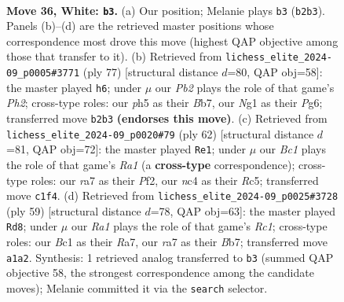 \documentclass[11pt]{article}
\begin{document}
\clearpage

\begin{figure}[p]\centering
\begin{subfigure}{0.46\textwidth}\centering
\resizebox{\linewidth}{!}{%
\newchessgame
\chessboard[
  setfen={3r4/r7/p1B1bk2/p4ppp/2n5/P4PP1/1P5P/RKB2RN1 w - - 2 36},
  showmover=false,
  pgfstyle=straightmove, color=movearrow, markmove={b2-b3}
]}
\caption{}
\end{subfigure}\hfill
\begin{subfigure}{0.46\textwidth}\centering
\resizebox{\linewidth}{!}{%
\newchessgame
\chessboard[
  setfen={8/pbp1r1kp/1p4p1/1P4N1/3rp3/6BP/R4PPK/8 b - - 1 39},
  showmover=false,
  pgfstyle=straightmove, color=movearrow, markmove={h7-h6}
]}
\caption{}
\end{subfigure}
\\[4pt]
\begin{subfigure}{0.46\textwidth}\centering
\resizebox{\linewidth}{!}{%
\newchessgame
\chessboard[
  setfen={3r4/2p1rpk1/p4n1p/2R2BpP/6P1/1P6/2P2P2/R4K2 w - - 3 32},
  showmover=false,
  pgfstyle=straightmove, color=movearrow, markmove={a1-e1}
]}
\caption{}
\end{subfigure}\hfill
\begin{subfigure}{0.46\textwidth}\centering
\resizebox{\linewidth}{!}{%
\newchessgame
\chessboard[
  setfen={2r3k1/rb1n2pp/2pPR3/1p6/p7/P1N2P2/1P4PP/3R1BK1 b - - 0 30},
  showmover=false,
  pgfstyle=straightmove, color=movearrow, markmove={c8-d8}
]}
\caption{}
\end{subfigure}
\caption{\textbf{Move 36, White: \texttt{b3}.} (a) Our position; Melanie plays \texttt{b3} (\texttt{b2b3}). Panels (b)--(d) are the retrieved master positions whose correspondence most drove this move (highest QAP objective among those that transfer to it). (b) Retrieved from \texttt{lichess\_elite\_2024-09\_p0005\#3771} (ply 77) [structural distance $d$=80, QAP obj=58]: the master played \texttt{h6}; under $\mu$ our \emph{Pb2} plays the role of that game's \emph{Ph2}; cross-type roles: our \emph{p}h5 as their \emph{B}b7, our \emph{N}g1 as their \emph{P}g6; transferred move \texttt{b2b3} \textbf{(endorses this move)}. (c) Retrieved from \texttt{lichess\_elite\_2024-09\_p0020\#79} (ply 62) [structural distance $d$=81, QAP obj=72]: the master played \texttt{Re1}; under $\mu$ our \emph{Bc1} plays the role of that game's \emph{Ra1} (a \textbf{cross-type} correspondence); cross-type roles: our \emph{r}a7 as their \emph{P}f2, our \emph{n}c4 as their \emph{R}c5; transferred move \texttt{c1f4}. (d) Retrieved from \texttt{lichess\_elite\_2024-09\_p0025\#3728} (ply 59) [structural distance $d$=78, QAP obj=63]: the master played \texttt{Rd8}; under $\mu$ our \emph{Ra1} plays the role of that game's \emph{Rc1}; cross-type roles: our \emph{B}c1 as their \emph{R}a7, our \emph{r}a7 as their \emph{B}b7; transferred move \texttt{a1a2}. Synthesis: 1 retrieved analog transferred to \texttt{b3} (summed QAP objective 58, the strongest correspondence among the candidate moves); Melanie committed it via the \texttt{search} selector.}
\label{fig:thought-m70}
\end{figure}
\end{document}

